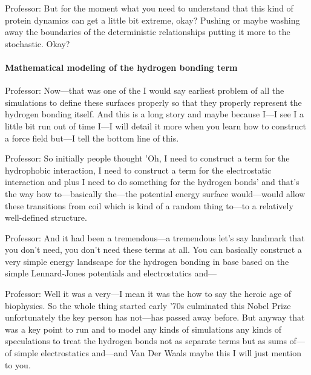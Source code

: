 Professor: But for the moment what you need to understand that this kind of protein dynamics can get a little bit extreme, okay? Pushing or maybe washing away the boundaries of the deterministic relationships putting it more to the stochastic. Okay?

\paragraph{Mathematical modeling of the hydrogen bonding term}

Professor: Now—that was one of the I would say earliest problem of all the simulations to define these surfaces properly so that they properly represent the hydrogen bonding itself. And this is a long story and maybe because I—I see I a little bit run out of time I—I will detail it more when you learn how to construct a force field but—I tell the bottom line of this.

Professor: So initially people thought 'Oh, I need to construct a term for the hydrophobic interaction, I need to construct a term for the electrostatic interaction and plus I need to do something for the hydrogen bonds' and that’s the way how to—basically the—the potential energy surface would—would allow these transitions from coil which is kind of a random thing to—to a relatively well-defined structure.

Professor: And it had been a tremendous—a tremendous let’s say landmark that you don’t need, you don’t need these terms at all. You can basically construct a very simple energy landscape for the hydrogen bonding in base based on the simple Lennard-Jones potentials and electrostatics and—

Professor: Well it was a very—I mean it was the how to say the heroic age of biophysics. So the whole thing started early '70s culminated this Nobel Prize unfortunately the key person has not—has passed away before. But anyway that was a key point to run and to model any kinds of simulations any kinds of speculations to treat the hydrogen bonds not as separate terms but as sums of—of simple electrostatics and—and Van Der Waals maybe this I will just mention to you.